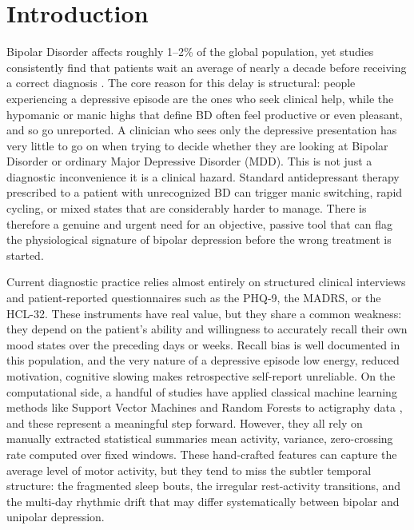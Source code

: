 \section{Introduction}

Bipolar Disorder affects roughly 1--2\% of the global population, yet studies consistently find that patients wait an average of nearly a decade before receiving a correct diagnosis \cite{garcia2018depresjon}. The core reason for this delay is structural: people experiencing a depressive episode are the ones who seek clinical help, while the hypomanic or manic highs that define BD often feel productive or even pleasant, and so go unreported. A clinician who sees only the depressive presentation has very little to go on when trying to decide whether they are looking at Bipolar Disorder or ordinary Major Depressive Disorder (MDD). This is not just a diagnostic inconvenience it is a clinical hazard. Standard antidepressant therapy prescribed to a patient with unrecognized BD can trigger manic switching, rapid cycling, or mixed states that are considerably harder to manage. There is therefore a genuine and urgent need for an objective, passive tool that can flag the physiological signature of bipolar depression before the wrong treatment is started.

Current diagnostic practice relies almost entirely on structured clinical interviews and patient-reported questionnaires such as the PHQ-9, the MADRS, or the HCL-32. These instruments have real value, but they share a common weakness: they depend on the patient's ability and willingness to accurately recall their own mood states over the preceding days or weeks. Recall bias is well documented in this population, and the very nature of a depressive episode low energy, reduced motivation, cognitive slowing makes retrospective self-report unreliable. On the computational side, a handful of studies have applied classical machine learning methods like Support Vector Machines and Random Forests to actigraphy data \cite{zanella2019feature}, and these represent a meaningful step forward. However, they all rely on manually extracted statistical summaries mean activity, variance, zero-crossing rate computed over fixed windows. These hand-crafted features can capture the average level of motor activity, but they tend to miss the subtler temporal structure: the fragmented sleep bouts, the irregular rest-activity transitions, and the multi-day rhythmic drift that may differ systematically between bipolar and unipolar depression.


